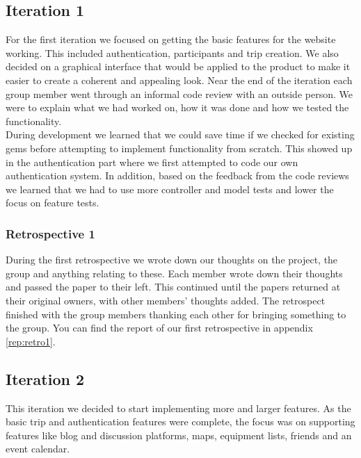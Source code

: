 \documentclass[a4paper]{article}
\begin{document}
\subsection{Iteration 1}
For the first iteration we focused on getting the basic features for the website working. This included authentication, participants and trip creation. We also decided on a graphical interface that would be applied to the product to make it easier to create a coherent and appealing look. Near the end of the iteration each group member went through an informal code review with an outside person. We were to explain what we had worked on, how it was done and how we tested the functionality.\\

\noindent
During development we learned that we could save time if we checked for existing gems before attempting to implement functionality from scratch. This showed up in the authentication part where we first attempted to code our own authentication system. In addition, based on the feedback from the code reviews we learned that we had to use more controller and model tests and lower the focus on feature tests.

\subsubsection{Retrospective 1}
During the first retrospective we wrote down our thoughts on the project, the group and anything relating to these. Each member wrote down their thoughts and passed the paper to their left. This continued until the papers returned at their original owners, with other members' thoughts added. The retrospect finished with the group members thanking each other for bringing something to the group. You can find the report of our first retrospective in appendix \ref{rep:retro1}.

\subsection{Iteration 2}
This iteration we decided to start implementing more and larger features. As the basic trip and authentication features were complete, the focus was on supporting features like blog and discussion platforms, maps, equipment lists, friends and an event calendar.
\end{document}
